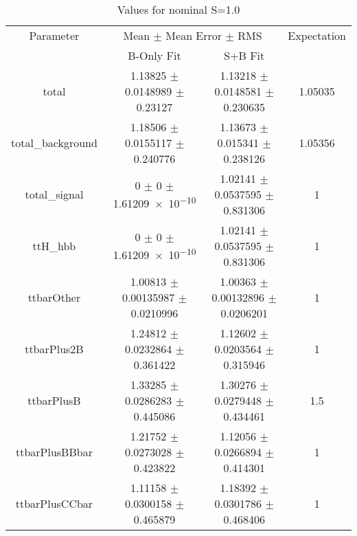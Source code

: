 \begin{table}
\centering
\caption{Values for nominal S=1.0}
\begin{tabular}{cccc}
\toprule
Parameter & \multicolumn{2}{c}{Mean $\pm$ Mean Error $\pm$ RMS} & Expectation\\
 & B-Only Fit & S+B Fit & \\
\midrule
total & \num{1.13825} $\pm$ \num{0.0148989} $\pm$ \num{0.23127} & \num{1.13218} $\pm$ \num{0.0148581} $\pm$ \num{0.230635} & \num{1.05035}\\
total\_background & \num{1.18506} $\pm$ \num{0.0155117} $\pm$ \num{0.240776} & \num{1.13673} $\pm$ \num{0.015341} $\pm$ \num{0.238126} & \num{1.05356}\\
total\_signal & \num{0} $\pm$ \num{0} $\pm$ \num{1.61209e-10} & \num{1.02141} $\pm$ \num{0.0537595} $\pm$ \num{0.831306} & \num{1}\\
ttH\_hbb & \num{0} $\pm$ \num{0} $\pm$ \num{1.61209e-10} & \num{1.02141} $\pm$ \num{0.0537595} $\pm$ \num{0.831306} & \num{1}\\
ttbarOther & \num{1.00813} $\pm$ \num{0.00135987} $\pm$ \num{0.0210996} & \num{1.00363} $\pm$ \num{0.00132896} $\pm$ \num{0.0206201} & \num{1}\\
ttbarPlus2B & \num{1.24812} $\pm$ \num{0.0232864} $\pm$ \num{0.361422} & \num{1.12602} $\pm$ \num{0.0203564} $\pm$ \num{0.315946} & \num{1}\\
ttbarPlusB & \num{1.33285} $\pm$ \num{0.0286283} $\pm$ \num{0.445086} & \num{1.30276} $\pm$ \num{0.0279448} $\pm$ \num{0.434461} & \num{1.5}\\
ttbarPlusBBbar & \num{1.21752} $\pm$ \num{0.0273028} $\pm$ \num{0.423822} & \num{1.12056} $\pm$ \num{0.0266894} $\pm$ \num{0.414301} & \num{1}\\
ttbarPlusCCbar & \num{1.11158} $\pm$ \num{0.0300158} $\pm$ \num{0.465879} & \num{1.18392} $\pm$ \num{0.0301786} $\pm$ \num{0.468406} & \num{1}\\
\bottomrule
\end{tabular}
\end{table}